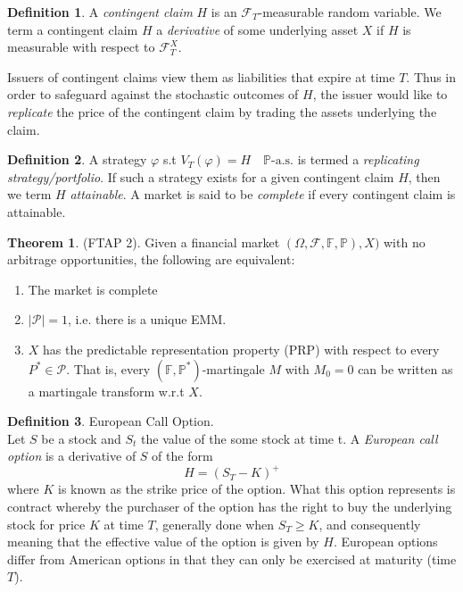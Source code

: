 \documentclass{article}
\theoremstyle{definition}
\newtheorem{definition}{Definition}[section]
\newtheorem{theorem}{Theorem}
\begin{document}
\begin{definition}
A \textit{contingent claim} $H$ is an $\mathcal{F}_{T}$-measurable random variable. We term a contingent claim $H$ a \textit{derivative} of some underlying asset $X$ if $H$ is measurable with respect to $\mathcal{F}_{T}^{X}$. 
\end{definition}
\noindent
Issuers of contingent claims view them as liabilities that expire at time $T$. Thus in order to safeguard against the stochastic outcomes of $H$, the issuer would like to \textit{replicate} the price of the contingent claim by trading the assets underlying the claim.
\begin{definition}
    A strategy $\varphi$ s.t $V_T(\varphi) = H \quad \mathbb{P} \text{-a.s.}$ is termed a \textit{replicating strategy/portfolio}. If such a strategy exists for a given contingent claim $H$, then we term $H$ \textit{attainable}. A market is said to be \textit{complete} if every contingent claim is attainable.
\end{definition}
\label{FTAP2}
\begin{theorem}
    (FTAP 2). Given a financial market $(\Omega, \mathcal{F}, \mathbb{F}, \mathbb{P}),X)$ with no arbitrage opportunities, the following are equivalent:
    \begin{enumerate}
        \item The market is complete
        \item $|\mathcal{P}| = 1$, i.e. there is a unique EMM.
        \item $X$ has the predictable representation property (PRP) with respect to every $P^* \in \mathcal{P}$. That is, every $(\mathbb{F}, \mathbb{P}^*)$-martingale $M$ with $M_0 = 0$ can be written as a martingale transform w.r.t $X$.
    \end{enumerate}
\end{theorem}
\begin{definition}
European Call Option.\\
Let $S$ be a stock and $S_{t}$ the value of the some stock at time t. A \textit{European call option} is a derivative of $S$ of the form $$H = (S_{T}-K)^{+}$$ where $K$ is known as the strike price of the option. What this option represents is contract whereby the purchaser of the option has the right to buy the underlying stock for price $K$ at time $T$, generally done when $S_{T} \geq K$, and consequently meaning that the effective value of the option is given by $H$.
European options differ from American options in that they can only be exercised at maturity (time $T$). 
\end{definition}
\end{document}
